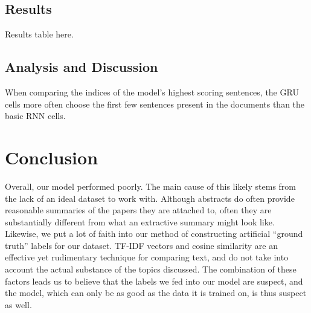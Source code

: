 \documentclass[11pt]{article}
\begin{document}
    \subsection{Results}
	Results table here.

    \subsection{Analysis and Discussion}
	When comparing the indices of the model's highest scoring sentences, the GRU cells more often choose the first few sentences present in the documents than the basic RNN cells.

\section{Conclusion}
	Overall, our model performed poorly. The main cause of this likely stems from the lack of an ideal dataset to work with. Although abstracts do often provide reasonable summaries of the papers they are attached to, often they are substantially different from what an extractive summary might look like. Likewise, we put a lot of faith into our method of constructing artificial ``ground truth'' labels for our dataset. TF-IDF vectors and cosine similarity are an effective yet rudimentary technique for comparing text, and do not take into account the actual substance of the topics discussed. The combination of these factors leads us to believe that the labels we fed into our model are suspect, and the model, which can only be as good as the data it is trained on, is thus suspect as well.

\pagebreak


\end{document}
